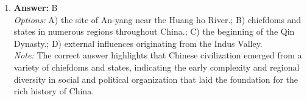 \documentclass[12pt]{article}
\begin{document}
\begin{enumerate}[label=\arabic*.]
\\ \textit{Note:} Uniformitarianism refers to the geological principle that the processes shaping the Earth today, such as erosion and sedimentation, have been consistent over time, encapsulated in the phrase "the slow agency of existing causes," which emphasizes the gradual and observable nature of these changes.
\item \textbf{Answer:} B
\\ \textit{Options:} A) the site of An-yang near the Huang ho River.; B) chiefdoms and states in numerous regions throughout China.; C) the beginning of the Qin Dynasty.; D) external influences originating from the Indus Valley.
\\ \textit{Note:} The correct answer highlights that Chinese civilization emerged from a variety of chiefdoms and states, indicating the early complexity and regional diversity in social and political organization that laid the foundation for the rich history of China.
\end{enumerate}
\end{document}
